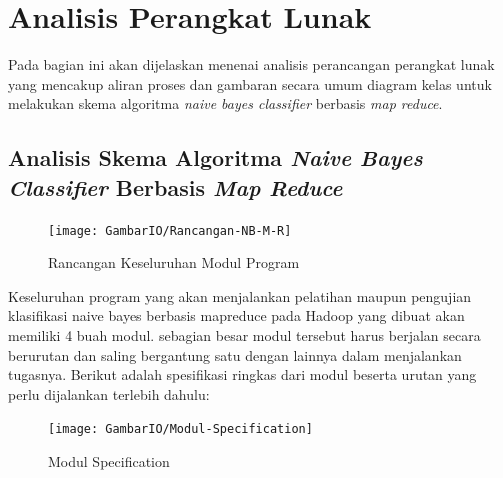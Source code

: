 
\section{Analisis Perangkat Lunak}

	Pada bagian ini akan dijelaskan menenai analisis perancangan perangkat lunak yang mencakup aliran proses dan gambaran secara umum diagram kelas untuk melakukan skema algoritma \textit{naive bayes classifier} berbasis \textit{map reduce}.

\subsection{Analisis Skema Algoritma \textit{Naive Bayes Classifier} Berbasis \textit{Map Reduce}}

\begin{figure}[ht]
	\centering
	\texttt{[image: GambarIO/Rancangan-NB-M-R]}
	\caption[Rancangan Keseluruhan Modul Program]{Rancangan Keseluruhan Modul Program}
	\label{fig:Rancangan Keseluruhan Modul Program}
\end{figure}

Keseluruhan program yang akan menjalankan pelatihan maupun pengujian klasifikasi naive bayes berbasis mapreduce pada Hadoop yang dibuat akan memiliki 4 buah modul. sebagian besar modul tersebut harus berjalan secara berurutan dan saling bergantung satu dengan lainnya dalam menjalankan tugasnya. Berikut adalah spesifikasi ringkas dari modul beserta urutan yang perlu dijalankan terlebih dahulu: 

\begin{figure}[H]
	\centering
	\texttt{[image: GambarIO/Modul-Specification]}
	\caption[Modul-Specification]{Modul Specification}
	\label{fig:Modul Specification}
\end{figure}

